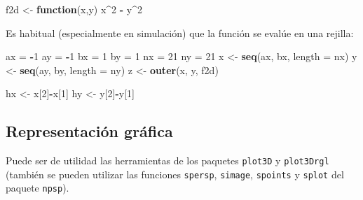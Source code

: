 \documentclass[
  spanish,
  10pt,
]{book}
\newenvironment{Shaded}{\begin{snugshade}}{\end{snugshade}}
\newcommand{\AttributeTok}[1]{\textcolor[rgb]{0.13,0.29,0.53}{#1}}
\newcommand{\ControlFlowTok}[1]{\textcolor[rgb]{0.13,0.29,0.53}{\textbf{#1}}}
\newcommand{\DecValTok}[1]{\textcolor[rgb]{0.00,0.00,0.81}{#1}}
\newcommand{\FunctionTok}[1]{\textcolor[rgb]{0.13,0.29,0.53}{\textbf{#1}}}
\newcommand{\NormalTok}[1]{#1}
\newcommand{\OtherTok}[1]{\textcolor[rgb]{0.56,0.35,0.01}{#1}}
\newcommand{\SpecialCharTok}[1]{\textcolor[rgb]{0.81,0.36,0.00}{\textbf{#1}}}
\theoremstyle{break}
\theoremstyle{nonumberplain}
\begin{document}
\begin{Shaded}
\begin{Highlighting}[]
\NormalTok{f2d }\OtherTok{\textless{}{-}} \ControlFlowTok{function}\NormalTok{(x,y) x}\SpecialCharTok{\^{}}\DecValTok{2} \SpecialCharTok{{-}}\NormalTok{ y}\SpecialCharTok{\^{}}\DecValTok{2}
\end{Highlighting}
\end{Shaded}

Es habitual (especialmente en simulación) que la función se evalúe en una rejilla:

\begin{Shaded}
\begin{Highlighting}[]
\NormalTok{ax }\OtherTok{=} \SpecialCharTok{{-}}\DecValTok{1}
\NormalTok{ay }\OtherTok{=} \SpecialCharTok{{-}}\DecValTok{1}
\NormalTok{bx }\OtherTok{=} \DecValTok{1}
\NormalTok{by }\OtherTok{=} \DecValTok{1}
\NormalTok{nx }\OtherTok{=} \DecValTok{21}
\NormalTok{ny }\OtherTok{=} \DecValTok{21}
\NormalTok{x }\OtherTok{\textless{}{-}} \FunctionTok{seq}\NormalTok{(ax, bx, }\AttributeTok{length =}\NormalTok{ nx)}
\NormalTok{y }\OtherTok{\textless{}{-}} \FunctionTok{seq}\NormalTok{(ay, by, }\AttributeTok{length =}\NormalTok{ ny)}
\NormalTok{z }\OtherTok{\textless{}{-}} \FunctionTok{outer}\NormalTok{(x, y, f2d)}

\NormalTok{hx }\OtherTok{\textless{}{-}}\NormalTok{ x[}\DecValTok{2}\NormalTok{]}\SpecialCharTok{{-}}\NormalTok{x[}\DecValTok{1}\NormalTok{]}
\NormalTok{hy }\OtherTok{\textless{}{-}}\NormalTok{ y[}\DecValTok{2}\NormalTok{]}\SpecialCharTok{{-}}\NormalTok{y[}\DecValTok{1}\NormalTok{]}
\end{Highlighting}
\end{Shaded}

\subsection{Representación gráfica}\label{representaciuxf3n-gruxe1fica}

Puede ser de utilidad las herramientas de los paquetes \texttt{plot3D} y \texttt{plot3Drgl}
(también se pueden utilizar las funciones \texttt{spersp}, \texttt{simage}, \texttt{spoints} y \texttt{splot}
del paquete \texttt{npsp}).
\end{document}
